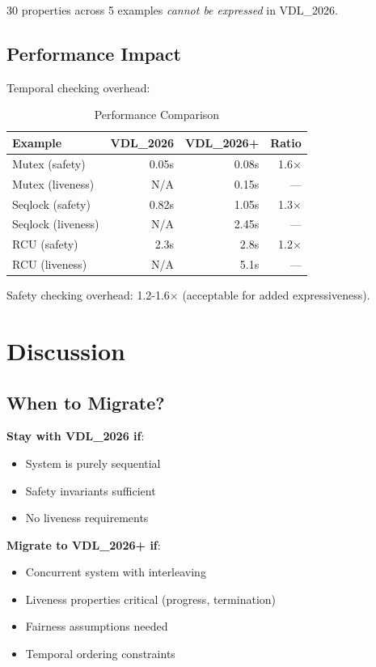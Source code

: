 \documentclass[conference]{IEEEtran}
\begin{document}
30 properties across 5 examples \textit{cannot be expressed} in VDL\_2026.

\subsection{Performance Impact}

Temporal checking overhead:

\begin{table}[h]
\centering
\caption{Performance Comparison}
\begin{tabular}{|l|r|r|r|}
\hline
\textbf{Example} & \textbf{VDL\_2026} & \textbf{VDL\_2026+} & \textbf{Ratio} \\
\hline
Mutex (safety) & 0.05s & 0.08s & 1.6× \\
Mutex (liveness) & N/A & 0.15s & --- \\
Seqlock (safety) & 0.82s & 1.05s & 1.3× \\
Seqlock (liveness) & N/A & 2.45s & --- \\
RCU (safety) & 2.3s & 2.8s & 1.2× \\
RCU (liveness) & N/A & 5.1s & --- \\
\hline
\end{tabular}
\end{table}

Safety checking overhead: 1.2-1.6× (acceptable for added expressiveness).

\section{Discussion}
\label{sec:discussion}

\subsection{When to Migrate?}

\textbf{Stay with VDL\_2026 if}:
\begin{itemize}
\item System is purely sequential
\item Safety invariants sufficient
\item No liveness requirements
\end{itemize}

\textbf{Migrate to VDL\_2026+ if}:
\begin{itemize}
\item Concurrent system with interleaving
\item Liveness properties critical (progress, termination)
\item Fairness assumptions needed
\item Temporal ordering constraints
\end{itemize}
\end{document}

